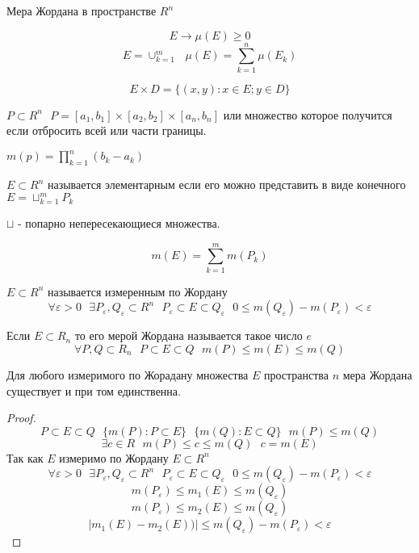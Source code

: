 \begin{title}[\Large]
  Мера Жордана в пространстве $R^n$
\end{title}

\begin{defin}
  $$
  E \to \mu (E) \ge 0
  $$
  $$
  E = \cup_{k=1}^m ~~~ \mu(E) = \sum_{k=1}^n \mu (E_k)
  $$
\end{defin}

\begin{defin}
   $$
   E \times D = \{ (x,y): x \in E; y \in D \}
   $$
\end{defin}

\begin{defin}[параллелипипеда]
  $P \subset R^n ~~~ P = [a_1, b_1] \times [a_2, b_2] \times [a_n, b_n]$ или
множество которое получится если отбросить всей или части границы.

  $m(p) = \prod_{k=1}^n (b_k - a_k)$

  $E \subset R^n$ называется элементарным если его можно представить в виде
конечного $E = \sqcup_{k=1}^m P_k$

  $\sqcup$ - попарно непересекающиеся множества.
\end{defin}

$$
m (E) = \sum_{k=1}^m m(P_k)
$$

\begin{defin}
  $E \subset R^n$ называется измеренным по Жордану
  $$
  \forall \varepsilon > 0 ~~~
  \exists P_{\varepsilon}, Q_{\varepsilon} \subset R^n ~~~
  P_{\varepsilon} \subset E \subset Q_{\varepsilon} ~~~
  0 \le m(Q_{\varepsilon}) - m(P_{\varepsilon}) < \varepsilon
  $$
\end{defin}

  Если $E \subset R_n$ то его мерой Жордана называется такое число $e$
  $$
  \forall P,Q \subset R_n ~~~
  P \subset E \subset Q ~~~
  m(P) \le m(E) \le m(Q)
  $$

\begin{theorem}
  Для любого измеримого по Жорадану множества $E$ пространства $n$ мера Жордана
существует и при том единственна.
\end{theorem}

\begin{proof}
  $$
  P \subset E \subset Q ~~~
  \{ m(P): P \subset E \} ~~~
  \{ m(Q): E \subset Q \} ~~~
  m(P) \le m(Q)
  $$
  $$
  \exists c \in R ~~~
  m(P) \le c \le m(Q) ~~~
  c = m(E)
  $$
  Так как $E$ измеримо по Жордану $E \subset R^n$
  $$
  \forall \varepsilon > 0 ~~~
  \exists P_{\varepsilon},Q_{\varepsilon} \subset R^n ~~~
  P_{\varepsilon} \subset E \subset Q_{\varepsilon} ~~~
  0 \le m(Q_{\varepsilon}) - m(P_\varepsilon) < \varepsilon
  $$
  $$
  m(P_{\varepsilon}) \le m_1 (E) \le m(Q_{\varepsilon})
  $$
  $$
  m(P_{\varepsilon}) \le m_2 (E) \le m(Q_{\varepsilon})
  $$
  $$
  |m_1 (E) - m_2 (E))| \le m(Q_{\varepsilon}) - m(P_{\varepsilon}) < \varepsilon
  $$
\end{proof}

